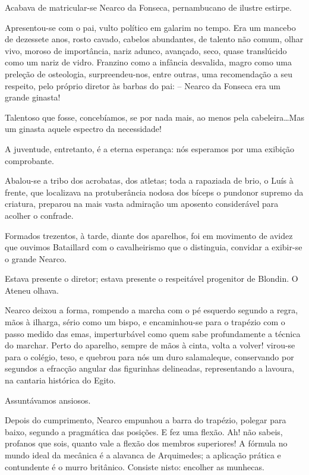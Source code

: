 Acabava de matricular{}-se Nearco da Fonseca, pernambucano de ilustre estirpe.

Apresentou{}-se com o pai, vulto político em galarim no tempo. Era um
mancebo de dezessete anos, rosto cavado, cabelos abundantes, de talento
não comum, olhar vivo, moroso de importância, nariz adunco, avançado,
seco, quase translúcido como um nariz de vidro. Franzino como a
infância desvalida, magro como uma preleção de osteologia,
surpreendeu{}-nos, entre outras, uma recomendação a seu respeito, pelo
próprio diretor às barbas do pai: -- Nearco da Fonseca era um grande
ginasta! 

Talentoso que fosse, concebíamos, se por nada mais, ao menos
pela cabeleira\ldots Mas um ginasta aquele espectro da necessidade! 

A juventude, entretanto, é a eterna esperança: nós esperamos por uma
exibição comprobante. 

Abalou{}-se a tribo dos acrobatas, dos atletas;
toda a rapaziada de brio, o Luís à frente, que localizava na
protuberância nodosa dos bíceps o pundonor supremo da criatura,
preparou na mais vasta admiração um aposento considerável para acolher
o confrade. 

Formados trezentos, à tarde, diante dos aparelhos, foi em
movimento de avidez que ouvimos Bataillard com o cavalheirismo que o
distinguia, convidar a exibir{}-se o grande Nearco. 

Estava presente o
diretor; estava presente o respeitável progenitor de Blondin. O Ateneu
olhava. 

Nearco deixou a forma, rompendo a marcha com o pé esquerdo
segundo a regra, mãos à ilharga, sério como um bispo, e encaminhou{}-se
para o trapézio com o passo medido das emas, imperturbável 
como quem sabe profundamente a técnica do marchar. Perto
do aparelho, sempre de mãos à cinta, volta a volver! virou{}-se para o
colégio, teso, e quebrou para nós um duro salamaleque, conservando por
segundos a efracção angular das figurinhas delineadas, representando a
lavoura, na cantaria histórica do Egito. 

Assuntávamos ansiosos. 

Depois do cumprimento, Nearco empunhou a barra do trapézio, polegar para
baixo, segundo a pragmática das posições. E fez uma flexão. Ah! não
sabeis, profanos que sois, quanto vale a flexão dos membros superiores!
A fórmula no mundo ideal da mecânica é a alavanca de Arquimedes; a
aplicação prática e contundente é o murro britânico. Consiste nisto:
encolher as munhecas. 

